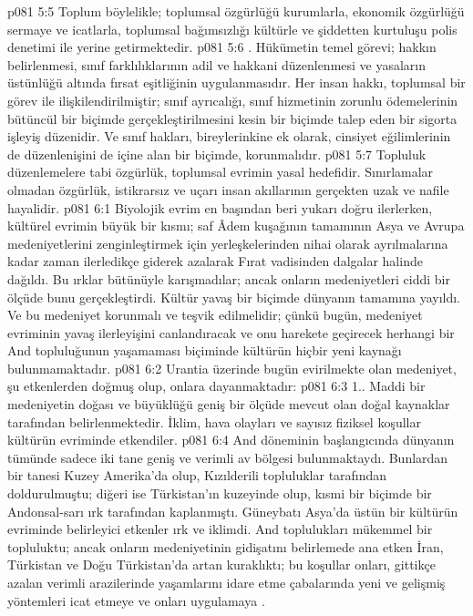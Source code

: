 \vs p081 5:5 Toplum böylelikle; toplumsal özgürlüğü kurumlarla, ekonomik özgürlüğü sermaye ve icatlarla, toplumsal bağımsızlığı kültürle ve şiddetten kurtuluşu polis denetimi ile yerine getirmektedir.
\vs p081 5:6 . Hükümetin temel görevi; hakkın belirlenmesi, sınıf farklılıklarının adil ve hakkani düzenlenmesi ve yasaların üstünlüğü altında fırsat eşitliğinin uygulanmasıdır. Her insan hakkı, toplumsal bir görev ile ilişkilendirilmiştir; sınıf ayrıcalığı, sınıf hizmetinin zorunlu ödemelerinin bütüncül bir biçimde gerçekleştirilmesini kesin bir biçimde talep eden bir sigorta işleyiş düzenidir. Ve sınıf hakları, bireylerinkine ek olarak, cinsiyet eğilimlerinin de düzenlenişini de içine alan bir biçimde, korunmalıdır.
\vs p081 5:7 Topluluk düzenlemelere tabi özgürlük, toplumsal evrimin yasal hedefidir. Sınırlamalar olmadan özgürlük, istikrarsız ve uçarı insan akıllarının gerçekten uzak ve nafile hayalidir.
\vs p081 6:1 Biyolojik evrim en başından beri yukarı doğru ilerlerken, kültürel evrimin büyük bir kısmı; saf Âdem kuşağının tamamının Asya ve Avrupa medeniyetlerini zenginleştirmek için yerleşkelerinden nihai olarak ayrılmalarına kadar zaman ilerledikçe giderek azalarak Fırat vadisinden dalgalar halinde dağıldı. Bu ırklar bütünüyle karışmadılar; ancak onların medeniyetleri ciddi bir ölçüde bunu gerçekleştirdi. Kültür yavaş bir biçimde dünyanın tamamına yayıldı. Ve bu medeniyet korunmalı ve teşvik edilmelidir; çünkü bugün, medeniyet evriminin yavaş ilerleyişini canlandıracak ve onu harekete geçirecek herhangi bir And topluluğunun yaşamaması biçiminde kültürün hiçbir yeni kaynağı bulunmamaktadır.
\vs p081 6:2 Urantia üzerinde bugün evirilmekte olan medeniyet, şu etkenlerden doğmuş olup, onlara dayanmaktadır:
\vs p081 6:3 1.\bibnobreakspace {}. Maddi bir medeniyetin doğası ve büyüklüğü geniş bir ölçüde mevcut olan doğal kaynaklar tarafından belirlenmektedir. İklim, hava olayları ve sayısız fiziksel koşullar kültürün evriminde etkendiler.
\vs p081 6:4 And döneminin başlangıcında dünyanın tümünde sadece iki tane geniş ve verimli av bölgesi bulunmaktaydı. Bunlardan bir tanesi Kuzey Amerika’da olup, Kızılderili topluluklar tarafından doldurulmuştu; diğeri ise Türkistan’ın kuzeyinde olup, kısmi bir biçimde bir Andonsal\hyp{}sarı ırk tarafından kaplanmıştı. Güneybatı Asya’da üstün bir kültürün evriminde belirleyici etkenler ırk ve iklimdi. And toplulukları mükemmel bir topluluktu; ancak onların medeniyetinin gidişatını belirlemede ana etken İran, Türkistan ve Doğu Türkistan’da artan kuraklıktı; bu koşullar onları, gittikçe azalan verimli arazilerinde yaşamlarını idare etme çabalarında yeni ve gelişmiş yöntemleri icat etmeye ve onları uygulamaya .
